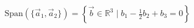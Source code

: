 \documentclass[preview]{standalone}
\begin{document}
\begin{align*}
\text{Span}(\{\vec{a}_1, \vec{a}_2\}) = \left\{ \vec{b} \in \mathbb{R}^3 \mid b_1 - \frac{1}{2}b_2 + b_3 = 0\right\}
\end{align*}
\end{document}
